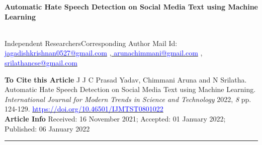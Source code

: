 \documentclass{letter}
\begin{document}
\begin{LARGE}
\textbf {Automatic Hate Speech Detection on Social Media Text \newline using Machine Learning }\\ 
\end{LARGE} \newline 
{}
\begin{footnotesize}\\
\newline  Independent Researchers\newline  Corresponding Author Mail Id: \href{mailto:jagadishkrishnan0527@gmail.com}{\textcolor{blue}{jagadishkrishnan0527@gmail.com}} ,\href{mailto: arunachimmani@gmail.com}{\textcolor{blue}{ arunachimmani@gmail.com}} , \href{mailto:srilathancse@gmail.com}{\textcolor{blue}{srilathancse@gmail.com }}   \\  
\end{footnotesize}
\begin{small}\newline 
\textbf{To Cite this Article}\newline
J J C Prasad Yadav, Chimmani Aruna and N Srilatha. Automatic Hate Speech Detection on Social Media Text using 
Machine Learning.\textit{ International Journal for Modern Trends in Science and Technology }2022, \textit{8} pp. 124-129.\newline
\href{https://doi.org/10.46501/IJMTST0801022}{\textcolor{blue}{https://doi.org/10.46501/IJMTST0801022}}\newline   \\ 
\textbf{Article Info}\newline
Received: 16 November 2021; Accepted: 01 January 2022; Published: 06 January 2022
\end{small}\newline
\noindent\rule{7in}{2pt}
\end{document}
